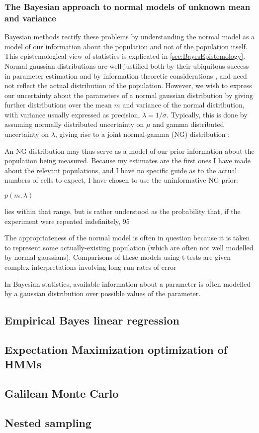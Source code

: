\subsubsection{The Bayesian approach to normal models of unknown mean and variance}
Bayesian methods rectify these problems by understanding the normal model as a model of our information about the population and not of the population itself. This epistemological view of statistics is explicated in \autoref{sec:BayesEpistemology}. Normal gaussian distributions are well-justified both by their ubiquitous success in parameter estimation and by information theoretic considerations \cite{Jaynes2003}, and need not reflect the actual distribution of the population. However, we wish to express our uncertainty about the parameters of a normal gaussian distribution by giving further distributions over the mean $m$ and variance of the normal distribution, with variance usually expressed as precision, $\lambda = 1/\sigma$. Typically, this is done by  assuming normally distributed uncertainty on $\mu$ and gamma distributed uncertainty on $\lambda$, giving rise to a joint normal-gamma (NG) distribution \cite{Bernardo2000}:

An NG distribution may thus serve as a model of our prior information about the population being measured. Because my estimates are the first ones I have made about the relevant populations, and I have no specific guide as to the actual numbers of cells to expect, I have chosen to use the uninformative NG prior:

$p(m,\lambda)$

lies within that range, but is rather understood as the probability that, if the experiment were repeated indefinitely, 95

The appropriateness of the normal model is often in question because it is taken to represent some actually-existing population (which are often not well modelled by normal gaussians). Comparisons of these models using t-tests are given complex interpretations involving long-run rates of error

In Bayesian statistics, available information about a parameter is often modelled by a gaussian distribution over possible values of the parameter. 

\subsection{Empirical Bayes linear regression}
\label{ssec:EmpiricalBayes}

\subsection{Expectation Maximization optimization of HMMs}
\label{ssec:EM}

\subsection{Galilean Monte Carlo}
\label{ssec:GMC}

\subsection{Nested sampling}
\label{ssec:nested}